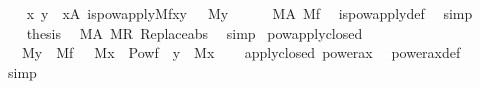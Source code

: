 \begin{isabellebody}
\isanewline
\ \ \isamarkupfalse%
\ {\isachardoublequoteopen}{\isasymAnd}x\ y{\isachardot}{\kern0pt}\ {\isasymlbrakk}\ x{\isasymin}A{\isacharsemicolon}{\kern0pt}\ is{\isacharunderscore}{\kern0pt}powapply{\isacharparenleft}{\kern0pt}M{\isacharcomma}{\kern0pt}f{\isacharcomma}{\kern0pt}x{\isacharcomma}{\kern0pt}y{\isacharparenright}{\kern0pt}\ {\isasymrbrakk}\ {\isasymLongrightarrow}\ M{\isacharparenleft}{\kern0pt}y{\isacharparenright}{\kern0pt}{\isachardoublequoteclose}\isanewline
\ \ \ \ \isamarkupfalse%
\ {\isacartoucheopen}M{\isacharparenleft}{\kern0pt}A{\isacharparenright}{\kern0pt}{\isacartoucheclose}\ {\isacartoucheopen}M{\isacharparenleft}{\kern0pt}f{\isacharparenright}{\kern0pt}{\isacartoucheclose}\ \isamarkupfalse%
\ is{\isacharunderscore}{\kern0pt}powapply{\isacharunderscore}{\kern0pt}def\ \isamarkupfalse%
\ simp\isanewline
\ \ \isamarkupfalse%
\isanewline
\ \ \isamarkupfalse%
\ {\isacharquery}{\kern0pt}thesis\ \isamarkupfalse%
\ {\isacartoucheopen}M{\isacharparenleft}{\kern0pt}A{\isacharparenright}{\kern0pt}{\isacartoucheclose}\ {\isacartoucheopen}M{\isacharparenleft}{\kern0pt}R{\isacharparenright}{\kern0pt}{\isacartoucheclose}\ Replace{\isacharunderscore}{\kern0pt}abs\ \isamarkupfalse%
\ simp\isanewline
{}\isamarkupfalse%
%
\endisatagproof
{\isafoldproof}%
%
\isadelimproof
\isanewline
%
\endisadelimproof
\isanewline
{}\isamarkupfalse%
\ powapply{\isacharunderscore}{\kern0pt}closed{\isacharcolon}{\kern0pt}\isanewline
\ \ {\isachardoublequoteopen}{\isasymlbrakk}\ M{\isacharparenleft}{\kern0pt}y{\isacharparenright}{\kern0pt}\ {\isacharsemicolon}{\kern0pt}\ M{\isacharparenleft}{\kern0pt}f{\isacharparenright}{\kern0pt}\ {\isasymrbrakk}\ {\isasymLongrightarrow}\ M{\isacharparenleft}{\kern0pt}{\isacharbraceleft}{\kern0pt}x\ {\isasymin}\ Pow{\isacharparenleft}{\kern0pt}f\ {\isacharbackquote}{\kern0pt}\ y{\isacharparenright}{\kern0pt}\ {\isachardot}{\kern0pt}\ M{\isacharparenleft}{\kern0pt}x{\isacharparenright}{\kern0pt}{\isacharbraceright}{\kern0pt}{\isacharparenright}{\kern0pt}{\isachardoublequoteclose}\isanewline
%
\isadelimproof
\ \ %
\endisadelimproof
%
\isatagproof
{}\isamarkupfalse%
\ apply{\isacharunderscore}{\kern0pt}closed\ power{\isacharunderscore}{\kern0pt}ax\ \isamarkupfalse%
\ power{\isacharunderscore}{\kern0pt}ax{\isacharunderscore}{\kern0pt}def\ \isamarkupfalse%
\ simp%
\endisatagproof
{\isafoldproof}%
%
\isadelimproof

\end{isabellebody}
